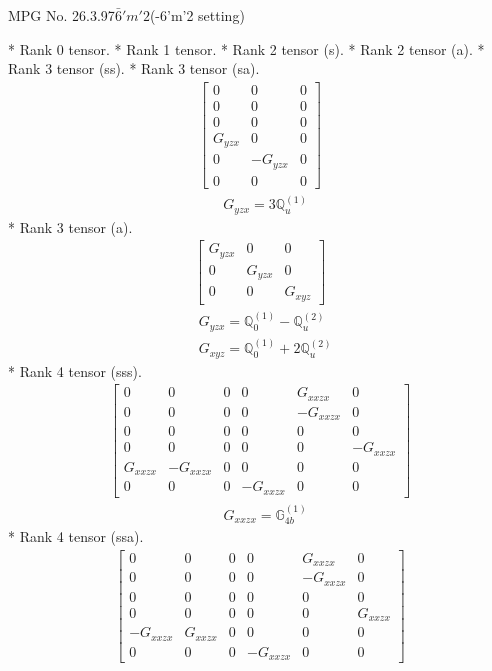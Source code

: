 \documentclass[fleqn,8pt,landscape]{jsarticle}
\begin{document}
\setcounter{MaxMatrixCols}{32}

\renewcommand{\tablename}{Table~}
\renewcommand{\figurename}{Figure~}
\begin{center}
\LARGE
MPG No. 26.3.97\quad$\bar{6}'m'2$\quad(-6'm'2 setting)
\end{center}
* Rank 0 tensor.
* Rank 1 tensor.
* Rank 2 tensor (s).
* Rank 2 tensor (a).
* Rank 3 tensor (ss).
* Rank 3 tensor (sa).
\begin{align*}
\begin{bmatrix} 0 & 0 & 0 \\ 0 & 0 & 0 \\ 0 & 0 & 0 \\ G_{yzx} & 0 & 0 \\ 0 & - G_{yzx} & 0 \\ 0 & 0 & 0 \end{bmatrix}
\end{align*}
\begin{align*}
& G_{yzx} = 3 \mathbb{Q}_{u}^{(1)}
\end{align*}
* Rank 3 tensor (a).
\begin{align*}
\begin{bmatrix} G_{yzx} & 0 & 0 \\ 0 & G_{yzx} & 0 \\ 0 & 0 & G_{xyz} \end{bmatrix}
\end{align*}
\begin{align*}
& G_{yzx} = \mathbb{Q}_{0}^{(1)} - \mathbb{Q}_{u}^{(2)} \\
& G_{xyz} = \mathbb{Q}_{0}^{(1)} + 2 \mathbb{Q}_{u}^{(2)}
\end{align*}
* Rank 4 tensor (sss).
\begin{align*}
\begin{bmatrix} 0 & 0 & 0 & 0 & G_{xxzx} & 0 \\ 0 & 0 & 0 & 0 & - G_{xxzx} & 0 \\ 0 & 0 & 0 & 0 & 0 & 0 \\ 0 & 0 & 0 & 0 & 0 & - G_{xxzx} \\ G_{xxzx} & - G_{xxzx} & 0 & 0 & 0 & 0 \\ 0 & 0 & 0 & - G_{xxzx} & 0 & 0 \end{bmatrix}
\end{align*}
\begin{align*}
& G_{xxzx} = \mathbb{G}_{4b}^{(1)}
\end{align*}
* Rank 4 tensor (ssa).
\begin{align*}
\begin{bmatrix} 0 & 0 & 0 & 0 & G_{xxzx} & 0 \\ 0 & 0 & 0 & 0 & - G_{xxzx} & 0 \\ 0 & 0 & 0 & 0 & 0 & 0 \\ 0 & 0 & 0 & 0 & 0 & G_{xxzx} \\ - G_{xxzx} & G_{xxzx} & 0 & 0 & 0 & 0 \\ 0 & 0 & 0 & - G_{xxzx} & 0 & 0 \end{bmatrix}
\end{align*}
\end{document}
